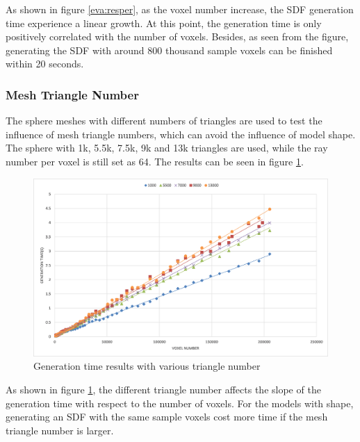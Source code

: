 As shown in figure \ref{eva:resper}, as the voxel number increase, the SDF generation time experience a linear growth. At this point, the generation time is only positively correlated with the number of voxels. Besides, as seen from the figure, generating the SDF with around 800 thousand sample voxels can be finished within 20 seconds.

\subsubsection{Mesh Triangle Number}

The sphere meshes with different numbers of triangles are used to test the influence of mesh triangle numbers, which can avoid the influence of model shape. The sphere with 1k, 5.5k, 7.5k, 9k and 13k triangles are used, while the ray number per voxel is still set as 64. The results can be seen in figure \ref{eva:triper}.

\clearpage

\begin{figure}[htbp]
    \centering
    \includegraphics[width=14cm]{Images/Chap5/Triangle.png}
    \caption{Generation time results with various triangle number}
    \label{eva:triper}
\end{figure}

As shown in figure \ref{eva:triper}, the different triangle number affects the slope of the generation time with respect to the number of voxels. For the models with shape, generating an SDF with the same sample voxels cost more time if the mesh triangle number is larger.